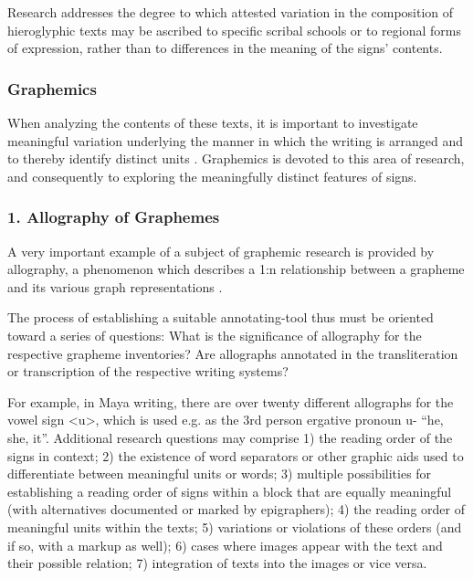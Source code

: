 \documentclass[amsthm,ebook]{saparticle}
\begin{document}
Research addresses the degree to which attested variation in the composition of hieroglyphic texts may be ascribed to
specific scribal schools or to regional forms of expression, rather than to differences in the meaning of the signs’
contents. 




\subsubsection{Graphemics }
When analyzing the contents of these texts, it is important to investigate meaningful variation underlying the manner in
which the writing is arranged and to thereby identify distinct units \citep{Bußmann2002}. Graphemics is devoted to this area
of research, and consequently to exploring the meaningfully distinct features of signs. 




\subsubsection[1. Allography of Graphemes ]{1. Allography of Graphemes }
A very important example of a subject of graphemic research is provided by allography, a phenomenon which describes a
1:n relationship between a grapheme and its various graph representations \citep{Crystal1997}. 

The process of establishing a suitable annotating-tool thus must be oriented toward a series of questions: What is the
significance of allography for the respective grapheme inventories? Are allographs annotated in the transliteration or
transcription of the respective writing systems? 

For example, in Maya writing, there are over twenty different allographs for the vowel sign {\textless}u{\textgreater},
which is used e.g. as the 3rd person ergative pronoun u- ``he, she, it''. Additional research questions may comprise 1)
the reading order of the signs in context; 2) the existence of word separators or other graphic aids used to
differentiate between meaningful units or words; 3) multiple possibilities for establishing a reading order of signs
within a block that are equally meaningful (with alternatives documented or marked by epigraphers); 4) the reading
order of meaningful units within the texts; 5) variations or violations of these orders (and if so, with a markup as
well); 6) cases where images appear with the text and their possible relation; 7) integration of texts into the images
or vice versa.
\end{document}

